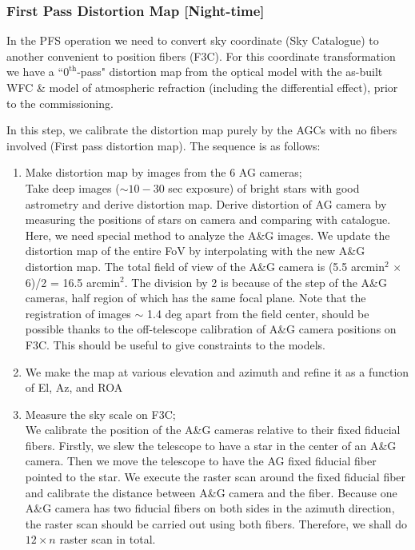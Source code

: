 \subsubsection{First Pass Distortion Map [Night-time]}\label{secflow:1stDM}

In the PFS operation we need to convert sky coordinate (Sky Catalogue) to another convenient to position fibers (F3C).
For this coordinate transformation we have a ``$0^\mathrm{th}$-pass" distortion map from the optical model with the as-built WFC \& model of atmospheric refraction (including the differential effect), prior to the commissioning.

In this step, we calibrate the distortion map purely by the AGCs with no fibers involved (First pass distortion map).
The sequence is as follows:
\begin{enumerate}
\item Make distortion map by images from the 6 AG cameras; \\
Take deep images ($\sim 10-30$ sec exposure) of bright stars with good astrometry and derive distortion map.
Derive distortion of AG camera by measuring the positions of stars on camera and comparing with catalogue.
Here, we need special method to analyze the A\&G images.
We update the distortion map of the entire FoV by interpolating with the new A\&G distortion map.
The total field of view of the A\&G camera is (5.5 arcmin$^2$ $\times$ 6)/2 = 16.5 arcmin$^2$.
The division by 2 is because of the step of the A\&G cameras, half region of which has the same focal plane. 
Note that the registration of images $\sim$ 1.4 deg apart from the field center, should be possible thanks to the off-telescope calibration of A\&G camera positions on F3C.
This should be useful to give constraints to the models.
\item We make the map at various elevation and azimuth and refine it as a function of El, Az, and ROA
\item Measure the sky scale on F3C; \\
We calibrate the position of the A\&G cameras relative to their fixed fiducial fibers.
Firstly, we slew the telescope to have a star in the center of an A\&G camera.
Then we move the telescope to have the AG fixed fiducial fiber pointed to the star.
We execute the raster scan around the fixed fiducial fiber and calibrate the distance between A\&G camera and the fiber.
Because one A\&G camera has two fiducial fibers on both sides in the azimuth direction, the raster scan should be carried out using both fibers.
Therefore, we shall do $12 \times n$ raster scan in total.
\end{enumerate}

